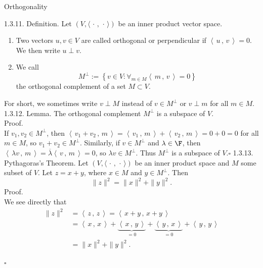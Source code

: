 \documentclass[smaller,hyperref={CJKbookmarks=true}]{beamer}
\newcommand{\scp}[2]{\left\langle\,#1\,,\,#2\,\right\rangle} \newcommand{\scpp}{\langle\,\cdot\,,\,\cdot\,\rangle}
\begin{document}
\begin{frame}{Orthogonality}
\begin{spacing}{0.9}
\alert{1.3.11. Definition.} Let $(V,\scpp)$ be an inner product vector space.
\begin{enumerate}[1.]
  \item Two vectors $u,v\in V$ are called orthogonal or perpendicular if $\scp{u}{v}=0$. We then write $u\perp v$.
  \item We call
  \begin{equation*}
    M^{\perp}:=\left\{v\in V:\mathop{\forall}_{m\in M}\scp{m}{v}=0\right\}
  \end{equation*}
  the orthogonal complement of a set $M\subset V$.
\end{enumerate}
For short, we sometimes write $v\perp M$ instead of $v\in M^{\perp}$ or $v\perp m$ for all $m\in M$.\\[10pt]
\alert{1.3.12. Lemma.} The orthogonal complement $M^{\perp}$ is a subspace of $V$.\\[10pt]
\alert{Proof.}\\[3pt]
If $v_1,v_2\in M^{\perp}$, then $\scp{v_1+v_2}{m}=\scp{v_1}{m}+\scp{v_2}{m}=0+0=0$ for all $m\in M$, so $v_1+v_2\in M^{\perp}$. Similarly, if $v\in M^{\perp}$ and $\lambda\in\F$, then $\scp{\lambda v}{m}=\overline{\lambda}\scp{v}{m}=0$, so $\lambda v\in M^{\perp}$. Thus $M^{\perp}$ is a subspace of $V$.\qquad\quad$\square$
\newpage
\alert{1.3.13. Pythagoras's Theorem.} Let $(V,\scpp)$ be an inner product space and $M$ some subset of $V$. Let $z=x+y$, where $x\in M$ and $y\in M^{\perp}$. Then
\[\|z\|^2=\|x\|^2+\|y\|^2.\]
\alert{Proof.}\\
We see directly that
\begin{align*}
  \|z\|^2 &=\scp{z}{z}=\scp{x+y}{x+y} \\
   &=\scp{x}{x}+\underbrace{\scp{x}{y}}_{=0}+\underbrace{\scp{y}{x}}_{=0}+\scp{y}{y}  \\
   &=\|x\|^2+\|y\|^2.
\end{align*}
\begin{flushright}
  $\square$
\end{flushright}
\end{spacing}
\end{frame}
\end{document}
